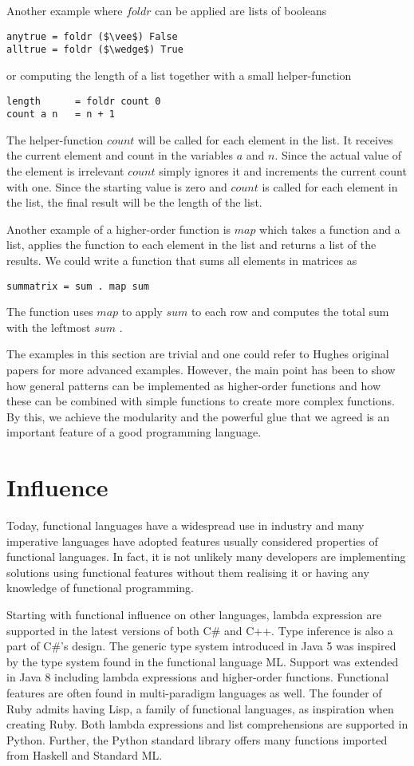 \documentclass[conference]{IEEEtran}
\begin{document}
Another example where $foldr$ can be applied are lists of booleans

\begin{lstlisting}[mathescape=true]
anytrue = foldr ($\vee$) False
alltrue = foldr ($\wedge$) True
\end{lstlisting}
or computing the length of a list together with a small helper-function
\begin{lstlisting}[mathescape=true]
length 		= foldr count 0
count a n 	= n + 1
\end{lstlisting}
The helper-function $count$ will be called for each element in the list. It receives the current element and count in the variables $a$ and $n$. Since the actual value of the element is irrelevant $count$ simply ignores it and increments the current count with one. Since the starting value is zero and $count$ is called for each element in the list, the final result will be the length of the list.

Another example of a higher-order function is $map$ which takes a function and a list, applies the function to each element in the list and returns a list of the results. We could write a function that sums all elements in matrices as
\begin{lstlisting}[mathescape=true]
summatrix = sum . map sum
\end{lstlisting}
The function uses $map$ to apply $sum$ to each row and computes the total sum with the leftmost $sum$ \cite{why}.

The examples in this section are trivial and one could refer to Hughes original papers for more advanced examples. However, the main point has been to show how general patterns can be implemented as higher-order functions and how these can be combined with simple functions to create more complex functions. By this, we achieve the modularity and the powerful glue that we agreed is an important feature of a good programming language.

\section{Influence}
Today, functional languages have a widespread use in industry and many imperative languages have adopted features usually considered properties of functional languages. In fact, it is not unlikely many developers are implementing solutions using functional features without them realising it or having any knowledge of functional programming.

Starting with functional influence on other languages, lambda expression are supported in the latest versions of both C\# and C++. Type inference is also a part of C\#'s design. The generic type system introduced in Java 5 was inspired by the type system found in the functional language ML. Support was extended in Java 8 including lambda expressions and higher-order functions. Functional features are often found in multi-paradigm languages as well. The founder of Ruby admits having Lisp, a family of functional languages, as inspiration when creating Ruby. Both lambda expressions and list comprehensions are supported in Python. Further, the Python standard library offers many functions imported from Haskell and Standard ML.
\end{document}
